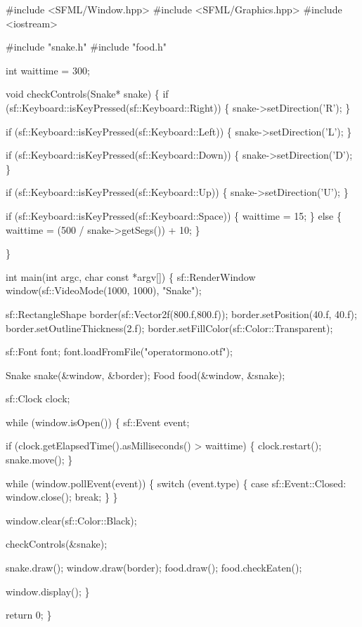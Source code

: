 \documentclass[11pt]{article}
\author{Varun Ramani}
\date{\today}
\title{}
\begin{document}
\tableofcontents

\#include <SFML/Window.hpp>
\#include <SFML/Graphics.hpp>
\#include <iostream>

\#include "snake.h"
\#include "food.h"

int waittime = 300;

void checkControls(Snake* snake) \{
    if (sf::Keyboard::isKeyPressed(sf::Keyboard::Right)) \{
        snake->setDirection('R');
    \}

if (sf::Keyboard::isKeyPressed(sf::Keyboard::Left)) \{
    snake->setDirection('L');
\}

if (sf::Keyboard::isKeyPressed(sf::Keyboard::Down)) \{
    snake->setDirection('D');
\}

if (sf::Keyboard::isKeyPressed(sf::Keyboard::Up)) \{
    snake->setDirection('U');
\}

if (sf::Keyboard::isKeyPressed(sf::Keyboard::Space)) \{
    waittime = 15;
\} else \{
    waittime = (500 / snake->getSegs()) + 10;
\}

\}

int main(int argc, char const *argv[])
\{
    sf::RenderWindow window(sf::VideoMode(1000, 1000), "Snake");

sf::RectangleShape border(sf::Vector2f(800.f,800.f));
border.setPosition(40.f, 40.f);
border.setOutlineThickness(2.f);
border.setFillColor(sf::Color::Transparent);

sf::Font font;
font.loadFromFile("operatormono.otf");

Snake snake(\&window, \&border);
Food food(\&window, \&snake);

sf::Clock clock;

while (window.isOpen()) \{
    sf::Event event;

if (clock.getElapsedTime().asMilliseconds() > waittime) \{
    clock.restart();
    snake.move();
\}

while (window.pollEvent(event)) \{
    switch (event.type) \{
        case sf::Event::Closed:
            window.close();
            break;
    \}
\}

window.clear(sf::Color::Black);

checkControls(\&snake);

snake.draw();
window.draw(border);
food.draw();
food.checkEaten();

    window.display();
\}

    return 0;
\}
\end{document}
